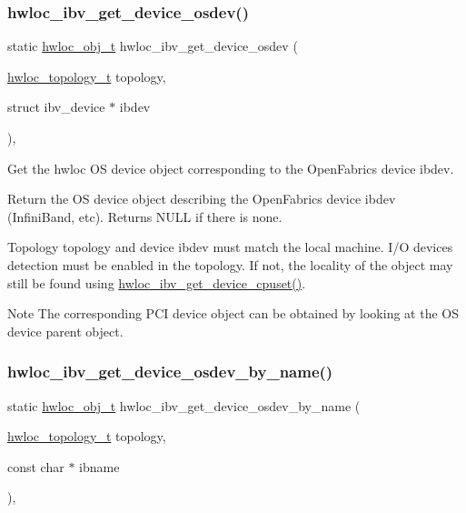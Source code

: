 \subsubsection{\texorpdfstring{hwloc\+\_\+ibv\+\_\+get\+\_\+device\+\_\+osdev()}{hwloc\_ibv\_get\_device\_osdev()}}
{\footnotesize\ttfamily static \hyperlink{a00185_ga79b8ab56877ef99ac59b833203391c7d}{hwloc\+\_\+obj\+\_\+t} hwloc\+\_\+ibv\+\_\+get\+\_\+device\+\_\+osdev (\begin{DoxyParamCaption}\item[{\hyperlink{a00186_ga9d1e76ee15a7dee158b786c30b6a6e38}{hwloc\+\_\+topology\+\_\+t}}]{topology,  }\item[{struct ibv\+\_\+device $\ast$}]{ibdev }\end{DoxyParamCaption})\hspace{0.3cm}{\ttfamily [inline]}, {\ttfamily [static]}}



Get the hwloc OS device object corresponding to the Open\+Fabrics device {\ttfamily ibdev}. 

Return the OS device object describing the Open\+Fabrics device {\ttfamily ibdev} (Infini\+Band, etc). Returns N\+U\+LL if there is none.

Topology {\ttfamily topology} and device {\ttfamily ibdev} must match the local machine. I/O devices detection must be enabled in the topology. If not, the locality of the object may still be found using \hyperlink{a00224_ga3ea0d838c1e7f1671b35687aae2da6ae}{hwloc\+\_\+ibv\+\_\+get\+\_\+device\+\_\+cpuset()}.

\begin{DoxyNote}{Note}
The corresponding P\+CI device object can be obtained by looking at the OS device parent object. 
\end{DoxyNote}
\mbox{\label{a00224_ga31d794567f4420bbdc8baa7bf8bf6138}} 
\subsubsection{\texorpdfstring{hwloc\+\_\+ibv\+\_\+get\+\_\+device\+\_\+osdev\+\_\+by\+\_\+name()}{hwloc\_ibv\_get\_device\_osdev\_by\_name()}}
{\footnotesize\ttfamily static \hyperlink{a00185_ga79b8ab56877ef99ac59b833203391c7d}{hwloc\+\_\+obj\+\_\+t} hwloc\+\_\+ibv\+\_\+get\+\_\+device\+\_\+osdev\+\_\+by\+\_\+name (\begin{DoxyParamCaption}\item[{\hyperlink{a00186_ga9d1e76ee15a7dee158b786c30b6a6e38}{hwloc\+\_\+topology\+\_\+t}}]{topology,  }\item[{const char $\ast$}]{ibname }\end{DoxyParamCaption})\hspace{0.3cm}{\ttfamily [inline]}, {\ttfamily [static]}}



